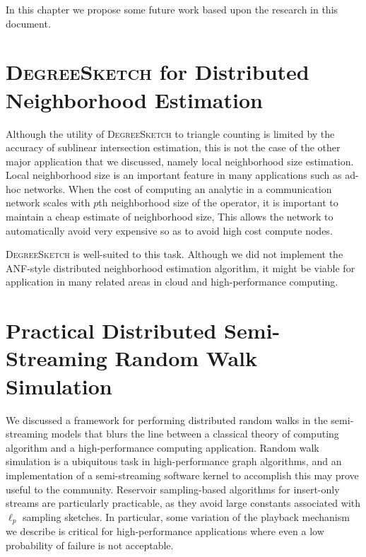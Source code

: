 \documentclass[10]{report}
\newcommand{\algoname}[1]{\textnormal{\textsc{#1}}}
\begin{document}
In this chapter we propose some future work based upon the research in this document.

\section{\algoname{DegreeSketch} for Distributed Neighborhood Estimation}

Although the utility of \algoname{DegreeSketch} to triangle counting is limited by the accuracy of sublinear intersection estimation, this is not the case of the other major application that we discussed, namely local neighborhood size estimation.
Local neighborhood size is an important feature in many applications such as ad-hoc networks.
When the cost of computing an analytic in a communication network scales with $p$th neighborhood size of the operator, it is important to maintain a cheap estimate of neighborhood size,
This allows the network to automatically avoid very expensive  so as to avoid high cost compute nodes.

\algoname{DegreeSketch} is well-suited to this task.
Although we did not implement the ANF-style distributed neighborhood estimation algorithm, it might be viable for application in many related areas in cloud and high-performance computing. 


\section{Practical Distributed Semi-Streaming Random Walk Simulation}

We discussed a framework for performing distributed random walks in the semi-streaming models that blurs the line between a classical theory of computing algorithm and a high-performance computing application.
Random walk simulation is a ubiquitous task in high-performance graph algorithms, and an implementation of a semi-streaming software kernel to accomplish this may prove useful to the community.
Reservoir sampling-based algorithms for insert-only streams are particularly practicable, as they avoid large constants associated with $\ell_p$ sampling sketches. 
In particular, some variation of the playback mechanism we describe is critical for high-performance applications where even a low probability of failure is not acceptable. 



% 

% 
 
 

\end{document}
